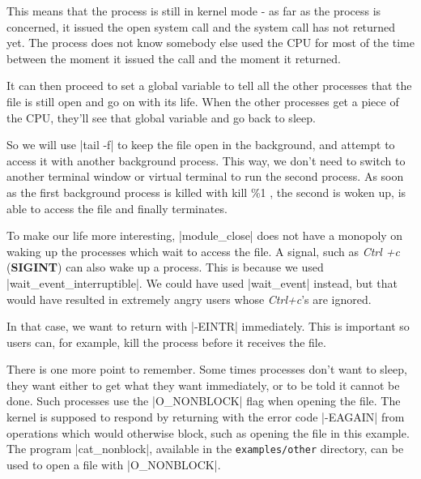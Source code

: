 \documentclass[10pt, oneside]{book}
\begin{document}
This means that the process is still in kernel mode - as far as the process is concerned, it issued the open system call and the system call has not returned yet.
The process does not know somebody else used the CPU for most of the time between the moment it issued the call and the moment it returned.

It can then proceed to set a global variable to tell all the other processes that the file is still open and go on with its life.
When the other processes get a piece of the CPU, they'll see that global variable and go back to sleep.

So we will use \sh|tail -f| to keep the file open in the background, and attempt to access it with another background process.
This way, we don't need to switch to another terminal window or virtual terminal to run the second process.
As soon as the first background process is killed with kill \%1 , the second is woken up, is able to access the file and finally terminates.

To make our life more interesting, \cpp|module_close| does not have a monopoly on waking up the processes which wait to access the file.
A signal, such as \emph{Ctrl +c} (\textbf{SIGINT}) can also wake up a process. This is because we used \cpp|wait_event_interruptible|.
We could have used \cpp|wait_event| instead, but that would have resulted in extremely angry users whose \emph{Ctrl+c}'s are ignored.

In that case, we want to return with \cpp|-EINTR| immediately. This is important so users can, for example, kill the process before it receives the file.

There is one more point to remember. Some times processes don't want to sleep, they want either to get what they want immediately, or to be told it cannot be done.
Such processes use the \cpp|O_NONBLOCK| flag when opening the file.
The kernel is supposed to respond by returning with the error code \cpp|-EAGAIN| from operations which would otherwise block, such as opening the file in this example. The program \sh|cat_nonblock|, available in the \verb|examples/other| directory, can be used to open a file with \cpp|O_NONBLOCK|.

\end{document}
